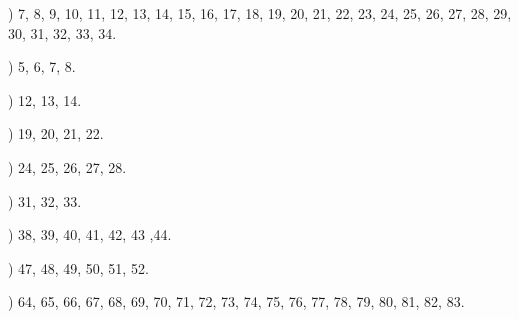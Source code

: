 \documentclass[a4paper,11pt]{article}
\begin{document}
\vspace{\spaceFour}



\noindent
{}) 7, 8, 9, 10, 11, 12, 13, 14, 15, 16, 17, 18, 19, 20,
21, 22, 23, 24, 25, 26, 27, 28, 29, 30, 31, 32, 33, 34.


\vspace{\spaceTwo}












\noindent
{}) 5, 6, 7, 8.

\vspace{\spaceFour}



\noindent
{}) 12, 13, 14.

\vspace{\spaceFour}



\noindent
{}) 19, 20, 21, 22.

\vspace{\spaceFour}



\noindent
{}) 24, 25, 26, 27, 28.

\vspace{\spaceFour}



\noindent
{}) 31, 32, 33.

\vspace{\spaceFour}



\noindent
{}) 38, 39, 40, 41, 42, 43 ,44.

\vspace{\spaceFour}



\noindent
{}) 47, 48, 49, 50, 51, 52.

\vspace{\spaceFour}



\noindent
{}) 64, 65, 66, 67, 68, 69, 70, 71, 72, 73, 74, 75, 76,
77, 78, 79, 80, 81, 82, 83.
\end{document}
